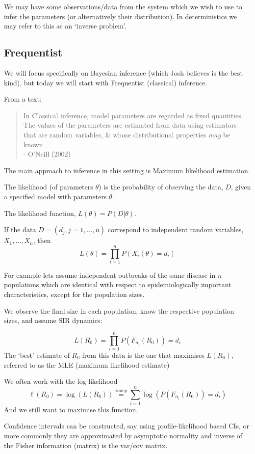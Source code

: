 \documentclass{/home/janmebows/Documents/LatexTemplates/myassignment}
\begin{document}
We may have some observations/data from the system which we wish to use to infer the parameters (or alternatively their distribution). In deterministics we may refer to this as an `inverse problem'.

\subsection{Frequentist}

We will focus specifically on Bayesian inference (which Josh believes is the best kind), but today we will start with Frequentist (classical) inference. 

From a text:

\begin{verse}
\noindent
{\centering
In Classical inference, model parameters are regarded as fixed quantities. The values of the parameters are estimated from data using estimators that are random variables, \& whose distributional properties \textit{may} be known}\\
- O'Neill (2002)
\end{verse}
The main approach to inference in this setting is Maximum likelihood estimation. 

The likelihood (of parameters $\theta$) is the probability of observing the data, $D$, given a specified model with parameters $\theta$.

The likelihood function, $L(\theta) = P(D|\theta)$.

If the data $D = (d_j,j=1,\ldots,n)$ correspond to independent random variables, $X_1,\ldots,X_n$, then
\[L(\theta) = \prod_{i=1}^n P(X_i(\theta) = d_i)\]

For example lets assume independent outbreaks of the same disease in $n$ populations which are identical with respect to epidemiologically important characteristics, except for the population sizes.

We observe the final size in each population, know the respective population sizes, and assume SIR dynamics:

\[L(R_0) = \prod_{i=1}^n P(F_{n_i}(R_0)) = d_i\]
The `best' estimate of $R_0$ from this data is the one that maximises $L(R_0)$, referred to as the MLE (maximum likelihood estimate)

We often work with the log likelihood
\[\ell(R_0) = \log(L(R_0)) \stackrel{indep}= \sum_{i=1}^n \log \left(P(F_{n_i}(R_0)) = d_i\right)\]
And we still want to maximise this function.


Confidence intervals can be constructed, say using profile-likelihood based CIs, or more commonly they are approximated by asymptotic normality and inverse of the Fisher information (matrix) is the var/cov matrix.
\end{document}
